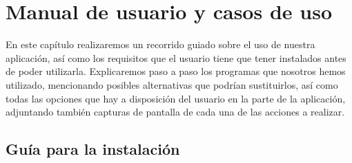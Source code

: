\chapter{Manual de usuario y casos de uso}
\label{cap:Capítulo 5}
En este capítulo realizaremos un recorrido guiado sobre el uso de nuestra aplicación, así como los requisitos que el usuario tiene que tener instalados antes de poder utilizarla. Explicaremos paso a paso los programas que nosotros hemos utilizado, mencionando posibles alternativas que podrían sustituirlos, así como todas las opciones que hay a disposición del usuario en la parte de la aplicación, adjuntando también capturas de pantalla de cada una de las acciones a realizar.

\section{Guía para la instalación}

